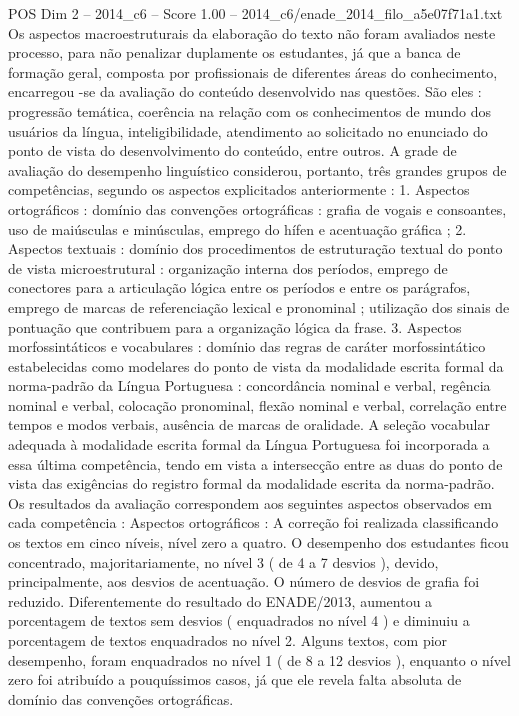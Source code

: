 \begin{textsample}{POS Dim 2 – 2014\_c6 – Score 1.00 – 2014\_c6/enade\_2014\_filo\_a5e07f71a1.txt}
Os aspectos macroestruturais da elaboração do texto não foram avaliados neste processo, para não penalizar duplamente os estudantes, já que a banca de formação geral, composta por profissionais de diferentes áreas do conhecimento, encarregou -se da avaliação do conteúdo desenvolvido nas questões.
São eles : progressão temática, coerência na relação com os conhecimentos de mundo dos usuários da língua, inteligibilidade, atendimento ao solicitado no enunciado do ponto de vista do desenvolvimento do conteúdo, entre outros.
A grade de avaliação do desempenho linguístico considerou, portanto, três grandes grupos de competências, segundo os aspectos explicitados anteriormente : 1.
Aspectos ortográficos : domínio das convenções ortográficas : grafia de vogais e consoantes, uso de maiúsculas e minúsculas, emprego do hífen e acentuação gráfica ; 2.
Aspectos textuais : domínio dos procedimentos de estruturação textual do ponto de vista microestrutural : organização interna dos períodos, emprego de conectores para a articulação lógica entre os períodos e entre os parágrafos, emprego de marcas de referenciação lexical e pronominal ; utilização dos sinais de pontuação que contribuem para a organização lógica da frase. 3.
Aspectos morfossintáticos e vocabulares : domínio das regras de caráter morfossintático estabelecidas como modelares do ponto de vista da modalidade escrita formal da norma-padrão da Língua Portuguesa : concordância nominal e verbal, regência nominal e verbal, colocação pronominal, flexão nominal e verbal, correlação entre tempos e modos verbais, ausência de marcas de oralidade.
A seleção vocabular adequada à modalidade escrita formal da Língua Portuguesa foi incorporada a essa última competência, tendo em vista a intersecção entre as duas do ponto de vista das exigências do registro formal da modalidade escrita da norma-padrão.
Os resultados da avaliação correspondem aos seguintes aspectos observados em cada competência : Aspectos ortográficos : A correção foi realizada classificando os textos em cinco níveis, nível zero a quatro.
O desempenho dos estudantes ficou concentrado, majoritariamente, no nível 3 ( de 4 a 7 desvios ), devido, principalmente, aos desvios de acentuação.
O número de desvios de grafia foi reduzido.
Diferentemente do resultado do ENADE/2013, aumentou a porcentagem de textos sem desvios ( enquadrados no nível 4 ) e diminuiu a porcentagem de textos enquadrados no nível 2.
Alguns textos, com pior desempenho, foram enquadrados no nível 1 ( de 8 a 12 desvios ), enquanto o nível zero foi atribuído a pouquíssimos casos, já que ele revela falta absoluta de domínio das convenções ortográficas.

\end{textsample}
